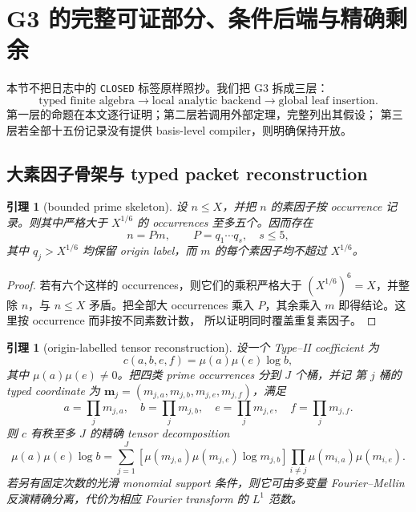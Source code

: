 \documentclass[11pt,a4paper]{ctexart}
\newtheorem{lemma}[theorem]{引理}
\theoremstyle{definition}
\newcommand{\1}{\mathbf 1}
\begin{document}
\section{G3 的完整可证部分、条件后端与精确剩余}

本节不把日志中的 \texttt{CLOSED} 标签原样照抄。我们把 G3 拆成三层：
\[
\boxed{
\text{typed finite algebra}
\longrightarrow
\text{local analytic backend}
\longrightarrow
\text{global leaf insertion}.}
\tag{6.1}
\]
第一层的命题在本文逐行证明；第二层若调用外部定理，完整列出其假设；
第三层若全部十五份记录没有提供 basis-level compiler，则明确保持开放。

\subsection{大素因子骨架与 typed packet reconstruction}

\begin{lemma}[bounded prime skeleton]\label{lem:prime-skeleton}
设 $n\le X$，并把 $n$ 的素因子按 occurrence 记录。则其中严格大于
$X^{1/6}$ 的 occurrences 至多五个。因而存在
\[
n=P m,\qquad P=q_1\cdots q_s,\quad s\le5,             \tag{6.2}
\]
其中 $q_j>X^{1/6}$ 均保留 origin label，而 $m$ 的每个素因子均不超过
$X^{1/6}$。
\end{lemma}

\begin{proof}
若有六个这样的 occurrences，则它们的乘积严格大于
$(X^{1/6})^6=X$，并整除 $n$，与 $n\le X$ 矛盾。把全部大 occurrences
乘入 $P$，其余乘入 $m$ 即得结论。这里按 occurrence 而非按不同素数计数，
所以证明同时覆盖重复素因子。
\end{proof}

\begin{lemma}[origin-labelled tensor reconstruction]\label{lem:typed-reconstruct}
设一个 Type--II coefficient 为
\[
c(a,b,e,f)=\mu(a)\mu(e)\log b,                         \tag{6.3}
\]
其中 $\mu(a)\mu(e)\ne0$。把四类 prime occurrences 分到 $J$ 个桶，并记
第 $j$ 桶的 typed coordinate 为
\(
\mathbf m_j=(m_{j,a},m_{j,b},m_{j,e},m_{j,f})
\)，满足
\[
a=\prod_jm_{j,a},\quad b=\prod_jm_{j,b},\quad
e=\prod_jm_{j,e},\quad f=\prod_jm_{j,f}.              \tag{6.4}
\]
则 $c$ 有秩至多 $J$ 的精确 tensor decomposition
\[
\mu(a)\mu(e)\log b
=\sum_{j=1}^{J}
 \left[\mu(m_{j,a})\mu(m_{j,e})\log m_{j,b}\right]
 \prod_{i\ne j}\mu(m_{i,a})\mu(m_{i,e}).             \tag{6.5}
\]
若另有固定次数的光滑 monomial support 条件，则它可由多变量 Fourier--Mellin
反演精确分离，代价为相应 Fourier transform 的 $L^1$ 范数。
\end{lemma}
\end{document}
